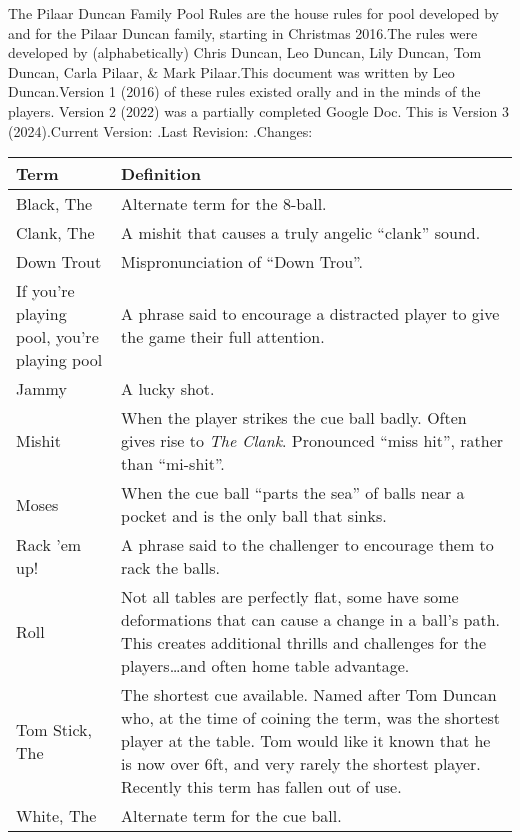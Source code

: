 
\renewcommand{\thesection}{\Alph{section}}


The Pilaar Duncan Family Pool Rules are the house rules for pool developed by and for the Pilaar Duncan family, starting in Christmas 2016.\standardspace[large]
The rules were developed by (alphabetically) Chris Duncan, Leo Duncan, Lily Duncan, Tom Duncan, Carla Pilaar, \& Mark Pilaar.\standardspace[large]
This document was written by Leo Duncan.\standardspace[large]
Version 1 (2016) of these rules existed orally and in the minds of the players. Version 2 (2022) was a partially completed Google Doc. This is Version 3 (2024).\standardspace[large]
Current Version: \currentversion.\standardspace[large]
Last Revision: \currentversiondate.\standardspace[large]
Changes: {\small \githublink}

\newpage


\small
\begin{center}
    \begin{tabular}{  p{}  p{}  } 
      \hline
      \textbf{Term} & \textbf{Definition} \\ \hline
      Black, The & Alternate term for the 8-ball. \\ \hline
      Clank, The & A mishit that causes a truly angelic “clank” sound. \\ \hline
      Down Trout & Mispronunciation of “Down Trou”. \\ \hline
      If you're playing pool, you're playing pool & A phrase said to encourage a distracted player to give the game their full attention. \\ \hline
      Jammy & A lucky shot. \\ \hline
      Mishit & When the player strikes the cue ball badly. Often gives rise to \emph{The Clank}. Pronounced “miss hit”, rather than “mi-shit”.\\ \hline
      Moses & When the cue ball “parts the sea” of balls near a pocket and is the only ball that sinks. \\ \hline
      Rack 'em up! & A phrase said to the challenger to encourage them to rack the balls. \\ \hline
      Roll & Not all tables are perfectly flat, some have some deformations that can cause a change in a ball's path. This creates additional thrills and challenges for the players\dots\hspace{1mm}and often home table advantage.\\ \hline
      Tom Stick, The & The shortest cue available. Named after Tom Duncan who, at the time of coining the term, was the shortest player at the table. Tom would like it known that he is now over 6ft, and very rarely the shortest player. Recently this term has fallen out of use. \\ \hline
      White, The & Alternate term for the cue ball. \\ \hline
    \end{tabular}
\end{center}
\normalsize
